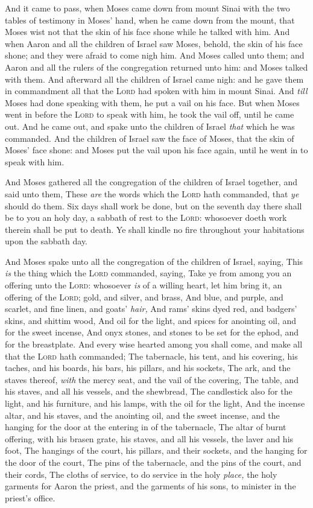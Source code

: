 \documentclass[11pt,letterpaper,oneside]{memoir}
\begin{document}
And it came to pass, when Moses came down from mount Sinai with the two
tables of testimony in Moses' hand, when he came down from the mount,
that Moses wist not that the skin of his face shone while he talked with
him. And when Aaron and all the children of Israel saw Moses, behold,
the skin of his face shone; and they were afraid to come nigh him. And
Moses called unto them; and Aaron and all the rulers of the congregation
returned unto him: and Moses talked with them. And afterward all the
children of Israel came nigh: and he gave them in commandment all that
the \textsc{Lord} had spoken with him in mount Sinai. And \emph{till}
Moses had done speaking with them, he put a vail on his face. But when
Moses went in before the \textsc{Lord} to speak with him, he took the
vail off, until he came out. And he came out, and spake unto the
children of Israel \emph{that} which he was commanded. And the children
of Israel saw the face of Moses, that the skin of Moses' face shone: and
Moses put the vail upon his face again, until he went in to speak with
him.

And Moses gathered all the congregation of the children of Israel
together, and said unto them, These \emph{are} the words which the
\textsc{Lord} hath commanded, that \emph{ye} should do them. Six days
shall work be done, but on the seventh day there shall be to you an holy
day, a sabbath of rest to the \textsc{Lord}: whosoever doeth work
therein shall be put to death. Ye shall kindle no fire throughout your
habitations upon the sabbath day.

And Moses spake unto all the congregation of the children of Israel,
saying, This \emph{is} the thing which the \textsc{Lord} commanded,
saying, Take ye from among you an offering unto the \textsc{Lord}:
whosoever \emph{is} of a willing heart, let him bring it, an offering of
the \textsc{Lord}; gold, and silver, and brass, And blue, and purple,
and scarlet, and fine linen, and goats' \emph{hair, }And rams' skins
dyed red, and badgers' skins, and shittim wood, And oil for the light,
and spices for anointing oil, and for the sweet incense, And onyx
stones, and stones to be set for the ephod, and for the breastplate. And
every wise hearted among you shall come, and make all that the
\textsc{Lord} hath commanded; The tabernacle, his tent, and his
covering, his taches, and his boards, his bars, his pillars, and his
sockets, The ark, and the staves thereof, \emph{with} the mercy seat,
and the vail of the covering, The table, and his staves, and all his
vessels, and the shewbread, The candlestick also for the light, and his
furniture, and his lamps, with the oil for the light, And the incense
altar, and his staves, and the anointing oil, and the sweet incense, and
the hanging for the door at the entering in of the tabernacle, The altar
of burnt offering, with his brasen grate, his staves, and all his
vessels, the laver and his foot, The hangings of the court, his pillars,
and their sockets, and the hanging for the door of the court, The pins
of the tabernacle, and the pins of the court, and their cords, The
cloths of service, to do service in the holy \emph{place,} the holy
garments for Aaron the priest, and the garments of his sons, to minister
in the priest's office.
\end{document}
